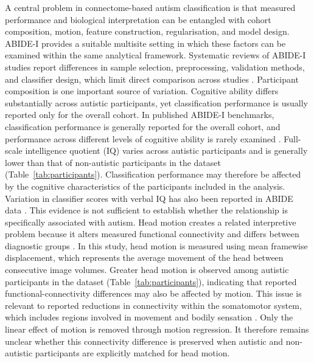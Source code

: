 A central problem in connectome-based autism classification is that measured performance and biological interpretation can be entangled with cohort composition, motion, feature construction, regularisation, and model design. ABIDE-I provides a suitable multisite setting in which these factors can be examined within the same analytical framework. Systematic reviews of ABIDE-I studies report differences in sample selection, preprocessing, validation methods, and classifier design, which limit direct comparison across studies \citep{Santanaetal2022,Hudaetal2024}. Participant composition is one important source of variation. Cognitive ability differs substantially across autistic participants, yet classification performance is usually reported only for the overall cohort. In published ABIDE-I benchmarks, classification performance is generally reported for the overall cohort, and performance across different levels of cognitive ability is rarely examined \citep{Heinsfeldetal2018,Eslamietal2019,AlmuqhimSaeed2021}. Full-scale intelligence quotient (IQ) varies across autistic participants and is generally lower than that of non-autistic participants in the dataset (Table~\ref{tab:participants}). Classification performance may therefore be affected by the cognitive characteristics of the participants included in the analysis. Variation in classifier scores with verbal IQ has also been reported in ABIDE data \citep{Nielsenetal2013}. This evidence is not sufficient to establish whether the relationship is specifically associated with autism. Head motion creates a related interpretive problem because it alters measured functional connectivity and differs between diagnostic groups \citep{Poweretal2012}. In this study, head motion is measured using mean framewise displacement, which represents the average movement of the head between consecutive image volumes. Greater head motion is observed among autistic participants in the dataset (Table~\ref{tab:participants}), indicating that reported functional-connectivity differences may also be affected by motion. This issue is relevant to reported reductions in connectivity within the somatomotor system, which includes regions involved in movement and bodily sensation \citep{Holigaetal2019,Ilioskaetal2023}. Only the linear effect of motion is removed through motion regression. It therefore remains unclear whether this connectivity difference is preserved when autistic and non-autistic participants are explicitly matched for head motion.

